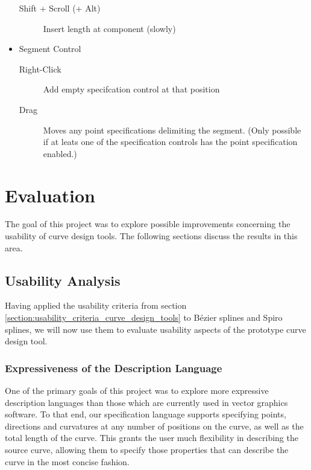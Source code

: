 \documentclass[a4paper]{article}
\begin{document}
\begin{itemize}
\begin{description}
							\item[Shift + Scroll (+ Alt)] Insert length at component (slowly)
						\end{description}
						\item Segment Control
						\begin{description}
							\item[Right-Click] Add empty specifcation control at that position
							\item[Drag] Moves any point specifications delimiting the segment. (Only possible if at leats one of the specification controls has the point specification enabled.)
						\end{description}
					\end{itemize}
		
	\section{Evaluation}
	\label{section:evaluation}

		The goal of this project was to explore possible improvements concerning the usability of curve design tools. The following sections discuss the results in this area.

		\subsection{Usability Analysis}
		\label{section:usability_analysis}

			Having applied the usability criteria from section \ref{section:usability_criteria_curve_design_tools} to Bézier splines and Spiro splines, we will now use them to evaluate usability aspects of the prototype curve design tool.

			\subsubsection{Expressiveness of the Description Language}
			\label{section:expressiveness_description_language}


				One of the primary goals of this project was to explore more expressive description languages than those which are currently used in vector graphics software. To that end, our specification language supports specifying points, directions and curvatures at any number of positions on the curve, as well as the total length of the curve. This grants the user much flexibility in describing the source curve, allowing them to specify those properties that can describe the curve in the most concise fashion.
\end{document}
